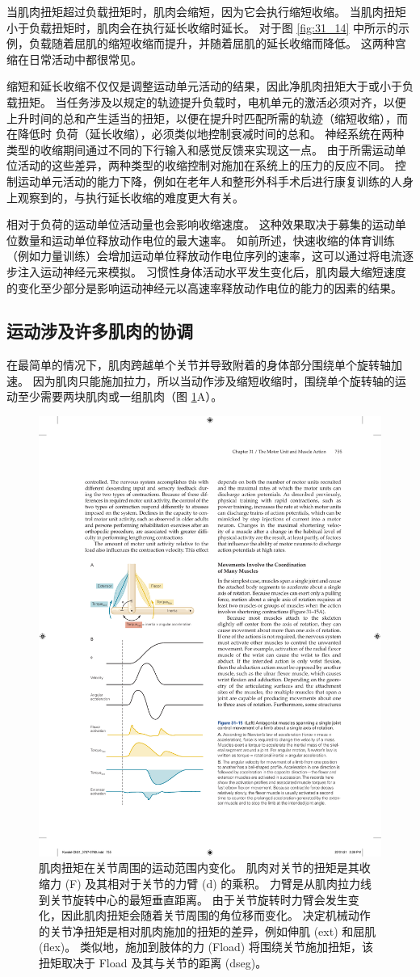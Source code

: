 当肌肉扭矩超过负载扭矩时，肌肉会缩短，因为它会执行缩短收缩。 当肌肉扭矩小于负载扭矩时，肌肉会在执行延长收缩时延长。 对于图 \ref{fig:31_14} 中所示的示例，负载随着屈肌的缩短收缩而提升，并随着屈肌的延长收缩而降低。 这两种宫缩在日常活动中都很常见。

缩短和延长收缩不仅仅是调整运动单元活动的结果，因此净肌肉扭矩大于或小于负载扭矩。 当任务涉及以规定的轨迹提升负载时，电机单元的激活必须对齐，以便上升时间的总和产生适当的扭矩，以便在提升时匹配所需的轨迹（缩短收缩），而在降低时 负荷（延长收缩），必须类似地控制衰减时间的总和。 神经系统在两种类型的收缩期间通过不同的下行输入和感觉反馈来实现这一点。 由于所需运动单位活动的这些差异，两种类型的收缩控制对施加在系统上的压力的反应不同。 控制运动单元活动的能力下降，例如在老年人和整形外科手术后进行康复训练的人身上观察到的，与执行延长收缩的难度更大有关。

相对于负荷的运动单位活动量也会影响收缩速度。 这种效果取决于募集的运动单位数量和运动单位释放动作电位的最大速率。 如前所述，快速收缩的体育训练（例如力量训练）会增加运动单位释放动作电位序列的速率，这可以通过将电流逐步注入运动神经元来模拟。 习惯性身体活动水平发生变化后，肌肉最大缩短速度的变化至少部分是影响运动神经元以高速率释放动作电位的能力的因素的结果。

\subsection{运动涉及许多肌肉的协调}
在最简单的情况下，肌肉跨越单个关节并导致附着的身体部分围绕单个旋转轴加速。 因为肌肉只能施加拉力，所以当动作涉及缩短收缩时，围绕单个旋转轴的运动至少需要两块肌肉或一组肌肉（图 \ref{fig:31_15}A）。

\begin{figure}[htbp]
	\centering
	\includegraphics[width=0.45\linewidth]{chap31/fig_31_15}
	\caption{肌肉扭矩在关节周围的运动范围内变化。 肌肉对关节的扭矩是其收缩力 (F) 及其相对于关节的力臂 (d) 的乘积。 力臂是从肌肉拉力线到关节旋转中心的最短垂直距离。 由于关节旋转时力臂会发生变化，因此肌肉扭矩会随着关节周围的角位移而变化。 决定机械动作的关节净扭矩是相对肌肉施加的扭矩的差异，例如伸肌 (ext) 和屈肌 (flex)。 类似地，施加到肢体的力 (Fload) 将围绕关节施加扭矩，该扭矩取决于 Fload 及其与关节的距离 (dseg)。}
	\label{fig:31_15}
\end{figure}

